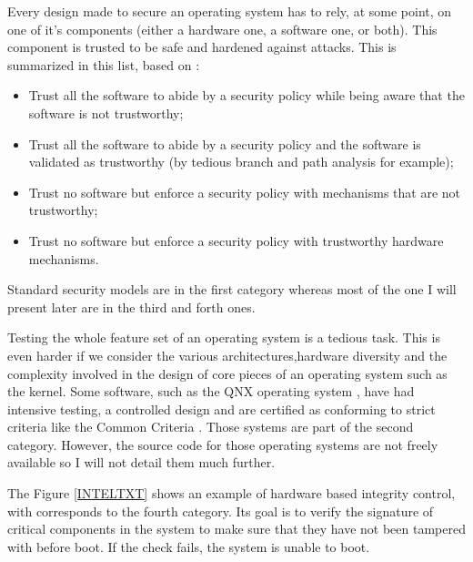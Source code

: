 \documentclass[pdftex,a4paper,titlepage,11pt]{article}
\begin{document}
Every design made to secure an operating system has to rely, at some point, on
one of it's components (either a hardware one, a software one, or both). This
component is trusted to be safe and hardened against attacks. This is summarized
in this list, based on \cite{wikipediacomputersecurity}:

\begin{itemize}
	\item Trust all the software to abide by a security policy while being aware
that the software is not trustworthy;

	\item Trust all the software to abide by a security policy and the software
is validated as trustworthy (by tedious branch and path analysis for example);

	\item Trust no software but enforce a security policy with mechanisms that
are not trustworthy;

	\item Trust no software but enforce a security policy with trustworthy
hardware mechanisms.
\end{itemize}

\smallskip

Standard security models are in the first category whereas most of the one I
will present later are in the third and forth ones.

\bigskip

Testing the whole feature set of an operating system is a tedious task. This is
even harder if we consider the various architectures,hardware diversity and the
complexity involved in the design of core pieces of an operating system such as
the kernel. Some software, such as the QNX operating system
\cite{qnxoperatingsystem}, have had
intensive testing, a controlled design and are certified as conforming to strict
criteria like the Common Criteria \cite{commoncriteria}. Those systems are part
of the
second category. However, the source code for those operating systems are not
freely available so I will not detail them much further.

\bigskip

The Figure \ref{INTELTXT} \cite{inteltxt} shows an example of hardware based
integrity control,
with corresponds to the fourth category. Its goal is to verify the signature
of critical components in the system to make sure that they have not been
tampered with before boot. If the check fails, the system is unable to boot.
\end{document}
